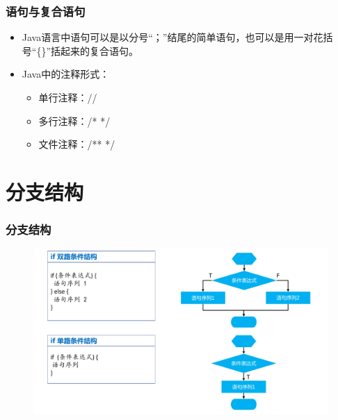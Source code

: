 \begin{frame}[fragile]
  \frametitle{语句与复合语句}
  \begin{itemize}
  \item Java语言中语句可以是以分号“；”结尾的简单语句，也可以是用一对花括号“\{\}”括起来的复合语句。
  \item Java中的注释形式：
    \begin{itemize}\small\Blue
    \item 单行注释：//
    \item 多行注释：/*    */
    \item 文件注释：/**   */
    \end{itemize}
  \end{itemize}

\end{frame}

\section{分支结构}

\begin{frame}[fragile]
  \frametitle{分支结构}

  
  \begin{figure}
    \centering
    \includegraphics[width=\textwidth]{ppt/flow-control-1.pdf}
  \end{figure}

\end{frame}

